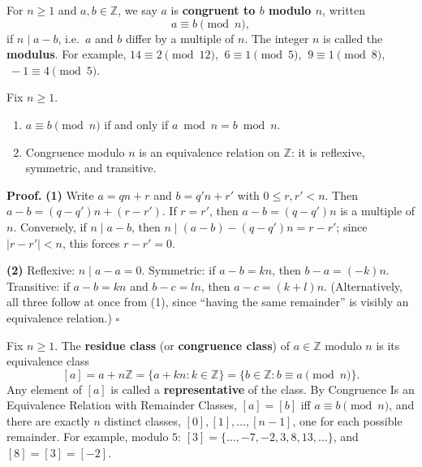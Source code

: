 \documentclass[11pt]{report}
\renewenvironment{proof}[1][Proof]{\noindent\textbf{#1.} }{\hfill$\square$\par\vspace{5pt}}
\begin{document}
\begin{defbox}\label{def:congruence-modulo-n}
For $n \geq 1$ and $a, b \in \mathbb{Z}$, we say $a$ is \textbf{congruent to $b$ modulo $n$}, written
\[ a \equiv b \pmod n, \]
if $n \mid a - b$, i.e.\ $a$ and $b$ differ by a multiple of $n$. The integer $n$ is called the \textbf{modulus}. For example, $14 \equiv 2 \pmod{12}$, $\ 6 \equiv 1 \pmod 5$, $\ 9 \equiv 1 \pmod 8$, $\ -1 \equiv 4 \pmod 5$.
\end{defbox}

\begin{propbox}\label{prop:congruence-equivalence-relation-remainder}
Fix $n \geq 1$.
\begin{enumerate}
    \item $a \equiv b \pmod n$ if and only if $a \bmod n = b \bmod n$.
    \item Congruence modulo $n$ is an equivalence relation on $\mathbb{Z}$: it is reflexive, symmetric, and transitive.
\end{enumerate}
\end{propbox}

\begin{proof}
\textbf{(1)} Write $a = qn + r$ and $b = q'n + r'$ with $0 \leq r, r' < n$. Then $a - b = (q - q')n + (r - r')$. If $r = r'$, then $a - b = (q - q')n$ is a multiple of $n$. Conversely, if $n \mid a - b$, then $n \mid (a - b) - (q - q')n = r - r'$; since $|r - r'| < n$, this forces $r - r' = 0$.

\textbf{(2)} Reflexive: $n \mid a - a = 0$. Symmetric: if $a - b = kn$, then $b - a = (-k)n$. Transitive: if $a - b = kn$ and $b - c = ln$, then $a - c = (k + l)n$. (Alternatively, all three follow at once from (1), since ``having the same remainder'' is visibly an equivalence relation.)
\end{proof}

\begin{defbox}\label{def:residue-classes}
Fix $n \geq 1$. The \textbf{residue class} (or \textbf{congruence class}) of $a \in \mathbb{Z}$ modulo $n$ is its equivalence class
\[ [a] = a + n\mathbb{Z} = \{a + kn : k \in \mathbb{Z}\} = \{ b \in \mathbb{Z} : b \equiv a \pmod n \}. \]
Any element of $[a]$ is called a \textbf{representative} of the class. By Congruence Is an Equivalence Relation with Remainder Classes, $[a] = [b]$ iff $a \equiv b \pmod n$, and there are exactly $n$ distinct classes, $[0], [1], \ldots, [n-1]$, one for each possible remainder. For example, modulo $5$: $[3] = \{\ldots, -7, -2, 3, 8, 13, \ldots\}$, and $[8] = [3] = [-2]$.
\end{defbox}
\end{document}
